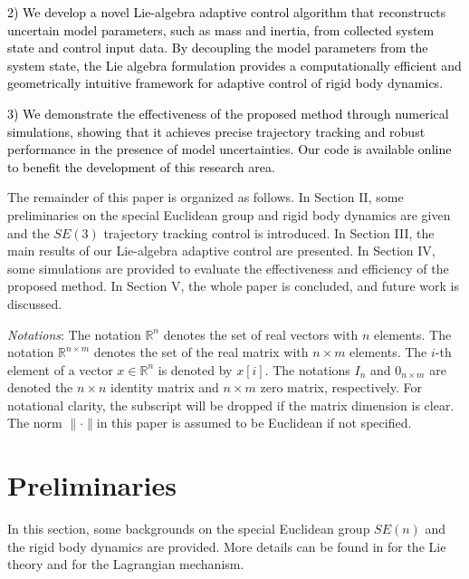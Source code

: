 \documentclass[lettersize,journal]{IEEEtran}
\begin{document}
\textcolor{black}{2) We develop a novel Lie-algebra adaptive control algorithm that reconstructs uncertain model parameters, such as mass and inertia, from collected system state and control input data. By decoupling the model parameters from the system state, the Lie algebra formulation provides a computationally efficient and geometrically intuitive framework for adaptive control of rigid body dynamics.}

\textcolor{black}{3) We demonstrate the effectiveness of the proposed method through numerical simulations, showing that it achieves precise trajectory tracking and robust performance in the presence of model uncertainties. Our code is available online to benefit the development of this research area.}


The remainder of this paper is organized as follows. In Section II, some preliminaries on the special Euclidean group and rigid body dynamics are given and the $SE(3)$ trajectory tracking control is introduced. In Section III,  the main results of our Lie-algebra adaptive control are presented. In Section IV, some simulations are provided to evaluate the effectiveness and efficiency of the proposed method. In Section V, the whole paper is concluded, and future work is discussed.

{\it Notations}:  The notation $\mathbb{R}^{n}$ denotes the set of real vectors with  $n$ elements. The notation $\mathbb{R}^{n\times m}$ denotes the set of the real matrix with  $n \times m$ elements.  The $i$-th element of a vector $ {x}\in \mathbb{R}^{n}$ is denoted by $x[i]$. The notations $I_{n}$ and $0_{n\times m}$ are denoted  the $n\times n$ identity matrix and $n\times m$ zero matrix, respectively. For notational clarity, the subscript will be dropped if the matrix dimension is clear. The norm $\|\cdot\|$in this paper is assumed to be Euclidean if not specified.

\section{Preliminaries}
In this section, some backgrounds on the special Euclidean group $SE(n)$ and the rigid body dynamics are provided. More details can be found in \cite{micro-lie-theory} for the Lie theory and \cite{murray2017mathematical} for the Lagrangian mechanism.
\end{document}
